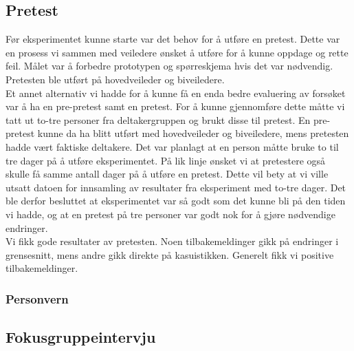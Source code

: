 \subsection{Pretest}
Før eksperimentet kunne starte var det behov for å utføre en pretest. Dette var en prosess vi sammen med veiledere ønsket å utføre for å kunne oppdage og rette feil. Målet var å forbedre prototypen og spørreskjema hvis det var nødvendig. Pretesten ble utført på hovedveileder og biveiledere. \\
Et annet alternativ vi hadde for å kunne få en enda bedre evaluering av forsøket var å ha en pre-pretest samt en pretest. For å kunne gjennomføre dette måtte vi tatt ut to-tre personer fra deltakergruppen og brukt disse til pretest. En pre-pretest kunne da ha blitt utført med hovedveileder og biveiledere, mens pretesten hadde vært faktiske deltakere. Det var planlagt at en person måtte bruke to til tre dager på å utføre eksperimentet. På lik linje ønsket vi at pretestere også skulle få samme antall dager på å utføre en pretest. Dette vil bety at vi ville utsatt datoen for innsamling av resultater fra eksperiment med to-tre dager. Det ble derfor besluttet at eksperimentet var så godt som det kunne bli på den tiden vi hadde, og at en pretest på tre personer var godt nok for å gjøre nødvendige endringer. \\
Vi fikk gode resultater av pretesten. Noen tilbakemeldinger gikk på endringer i grensesnitt, mens andre gikk direkte på kasuistikken. Generelt fikk vi positive tilbakemeldinger.

\subsubsection{Personvern}



\subsection{Fokusgruppeintervju}
